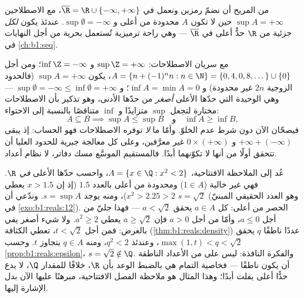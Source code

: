 \begin{remark}
من المريح أن نضمّ رمزين ونعمل في $\overline\R = \R
\cup \{-\infty, +\infty\}$، مع الاصطلاحين $\sup A = +\infty$
حين لا تكون $A$ محدودة من أعلى و $\sup \emptyset = -\infty$. عندئذ يكون
\emph{لكل}  جزئية من $\R$ حدٌّ أعلى في $\overline\R$ --- وهي
راحة ترميزية تُستعمل بحرية من أجل النهايات في \cref{ch:b1:seq}.
\end{remark}

\begin{example}\label{ex:b1:reals:extendedcompute}
مع سريان الاصطلاحات: $\sup \Z = +\infty$ و $\inf \Z =
-\infty$؛ ومن أجل $A = \{n + (-1)^n n : n \in \N\} = \{0, 4, 0, 8,
\dots\} \cup \{0\}$، يكون $\sup A = +\infty$ (فالحدود الزوجية $2n$ غير
محدودة) و $\inf A = \min A = 0$؛ و $\sup\emptyset =
-\infty \leq \inf\emptyset = +\infty$ --- وهي  الوحيدة التي
حدّها الأعلى \emph{أصغر} من حدّها الأدنى، وهو تذكير بأن
الاصطلاحات مختارة لتجعل $\sup$ متزايدًا و $\inf$
متناقصًا بالنسبة إلى الاحتواء:
\[
A \subseteq B \implies \sup A \leq \sup B
\quad\text{و}\quad \inf A \geq \inf B ,
\]
فيصحّان الآن دون شرط عدم الخلوّ. وأمّا ما \emph{لا}
توفره الاصطلاحات فهو الحساب: إذ يبقى $+\infty + (-\infty)$ و $0
\times (+\infty)$ غير معرَّفين، وعلى كل معالجة
جبرية للحدود العليا أن تتحقق أولًا من أنها لا تكوّنهما أبدًا.
فالمستقيم الموسَّع مسك دفاتر، لا نظام أعداد.
\end{example}

\begin{example}\label{ex:b1:reals:supescape}
عُد إلى  الملاحظة الافتتاحية، $A = \{x \in \Q : x^2 <
2\}$، واحسب حدّها الأعلى \emph{في $\R$}. فهي غير خالية
($1 \in A$) ومحدودة من أعلى بالعدد $1.5$ (إذ إن $x > 1.5$ يعطي $x^2 >
2.25 > 2$)، ومنه يوجد $s = \sup A$. وندّعي أن $s = \sqrt 2$ (وهو العدد
الحقيقي المبنيّ في \cref{exo:b1:reals:12}). الحصر من أعلى: كل
$a \in A$ يحقق $a < \sqrt2$ --- فهذا جليّ من أجل $a \leq 0$،
وأمّا من أجل $a > 0$ فإن $a \geq \sqrt2$ يعطي $a^2 \geq 2$.
ولا شيء أصغر يفي بالغرض: فمن أجل $t < \sqrt2$، تعطي الكثافة
(\cref{thm:b1:reals:density}) عددًا ناطقًا $q$ يحقق
$\max(1, t) < q < \sqrt 2$، وعندئذ $q^2 < 2$، ومنه $q \in A$
يتجاوز $t$. وحسب \cref{prop:b1:reals:epsilon}، $s = \sqrt2
\notin \Q$. والفكرة النافذة: ليس على   من
الأعداد الناطقة أن يكون ناطقًا --- فخاصية التمام هي بالضبط
الوعد بأن $\R$، خلافًا للمقدار $\Q$، لا يدع حدًّا أعلى يفلت أبدًا؛
وهذا المثال هو ملاحظة الفصل الافتتاحية، مبرهنًا عليها الآن
بدل الإشارة إليها.
\end{example}

